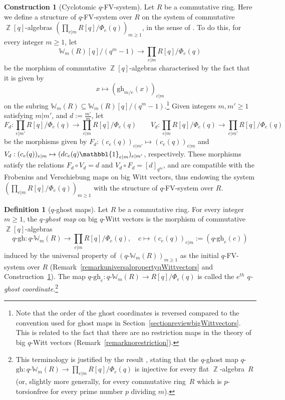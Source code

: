 \documentclass[10pt,twoside]{scrarticle}
\newlength{\mar} \setlength{\mar}{1cm}%
\newlength{\len}
\theoremstyle{definition}
\newtheorem{construction}[theorem]{Construction}
\newtheorem{definition}[theorem]{Definition}
\DeclareMathOperator{\Z}{\mathbb{Z}}
\newcommand{\W}{\mathbb{W}}
\newcommand{\qWm}{q\text{-}\mathbb{W}_m}
\newcommand{\gh}{\mathrm{gh}}
\renewcommand{\ge}{\geqslant}
\numberwithin{equation}{theorem}
\begin{document}
\begin{construction}[Cyclotomic $q$-FV-system]\label{constructioncyclotomicqFVsystem}
    Let $R$ be a commutative ring. Here we define a structure of $q$-FV-system over $R$ on the system of commutative $\Z[q]$-algebras $(\prod_{e|m} R[q]/\Phi_e(q))_{m \ge 1}$, in the sense of \cite[Definition~2.8]{wagner_q-witt_2024}. To do this, for every integer $m \ge 1$, let 
    $$\W_m(R)[q]/(q^m-1) \longrightarrow \prod_{e|m} R[q]/\Phi_e(q)$$
    be the morphism of commutative $\Z[q]$-algebras characterised by the fact that it is given by $$x \longmapsto (\gh_{m/e}(x))_{e|m}$$ on the subring $\W_m(R) \subseteq \W_m(R)[q]/(q^m-1)$.\footnote{Note that the order of the ghost coordinates is reversed compared to the convention used for ghost maps in Section~\ref{sectionreviewbigWittvectors}. This is related to the fact that there are no restriction maps in the theory of big $q$-Witt vectors (Remark~\ref{remarknorestriction}).} Given integers $m,m' \ge 1$ satisfying $m|m'$, and $d := \frac{m'}{m}$, let 
    $$F_{d} : \prod_{e|m'} R[q]/\Phi_e(q) \longrightarrow \prod_{e|m} R[q]/\Phi_e(q) \quad \quad V_{d} : \prod_{e|m} R[q]/\Phi_e(q) \longrightarrow \prod_{e|m'} R[q]/\Phi_e(q)$$
    be the morphisms given by $F_d : (c_e(q))_{e|m'} \mapsto (c_e(q))_{e|m}$ and $V_d : (c_e(q))_{e|m} \mapsto (dc_e(q)\mathbbl{1}_{e|m})_{e|m'}$, respectively. These morphisms satisfy the relations $F_d \circ V_d = d$ and $V_d \circ F_d = [d]_{q^m}$, and are compatible with the Frobenius and Verschiebung maps on big Witt vectors, thus endowing the system $(\prod_{e|m} R[q]/\Phi_e(q))_{m \ge 1}$ with the structure of $q$-FV-system over $R$.
\end{construction}

\begin{definition}[$q$-ghost maps]\label{definitionqghostmaps}
    Let $R$ be a commutative ring. For every integer $m \ge 1$, the \emph{$q$-ghost map} on big $q$-Witt vectors is the morphism of commutative $\Z[q]$-algebras
    $$q\text{-}\gh : \qWm(R) \longrightarrow \prod_{e|m} R[q]/\Phi_e(q), \quad c \longmapsto (c_e(q))_{e|m} := (q\text{-}\gh_e(c))$$
    induced by the universal property of $(\qWm(R))_{m \ge 1}$ as the initial $q$-FV-system over $R$ (Remark~\ref{remarkuniversalpropertyqWittvectors} and Construction~\ref{constructioncyclotomicqFVsystem}). The map $q\text{-}\gh_e : \qWm(R) \rightarrow R[q]/\Phi_e(q)$ is called the \emph{$e^{th}$ $q$-ghost coordinate}.\footnote{This terminology is justified by the result \cite[Lemma~2.23]{wagner_q-witt_2024}, stating that the $q$-ghost map \hbox{$q$-$\gh : \qWm(R) \rightarrow \prod_{e|m} R[q]/\Phi_e(q)$} is injective for every flat $\Z$-algebra~$R$ (or, slightly more generally, for every commutative ring~$R$ which is $p$-torsionfree for every prime number $p$ dividing $m$).}
\end{definition}
\end{document}

